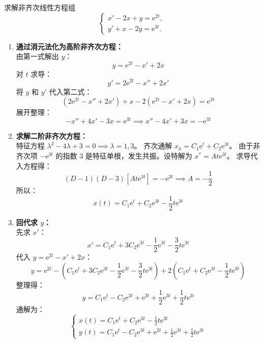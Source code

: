 \documentclass[lang=cn,11pt]{elegantbook}
\begin{document}
\begin{exercise}[提高：非齐次方程组]
求解非齐次线性方程组
\[
\begin{cases}
x'-2x+y=\mathrm{e}^{2t},\\
y'+x-2y=\mathrm{e}^{3t}.
\end{cases}
\]
\end{exercise}
\begin{solution}
\begin{enumerate}
    \item \textbf{通过消元法化为高阶非齐次方程：}\\
    由第一式解出 $y$：
    \[
    y = \mathrm{e}^{2t} - x' + 2x
    \]
    对 $t$ 求导：
    \[
    y' = 2\mathrm{e}^{2t} - x'' + 2x'
    \]
    将 $y$ 和 $y'$ 代入第二式：
    \[
    (2\mathrm{e}^{2t} - x'' + 2x') + x - 2(\mathrm{e}^{2t} - x' + 2x) = \mathrm{e}^{3t}
    \]
    展开整理：
    \[
    -x'' + 4x' - 3x = \mathrm{e}^{3t} \implies x'' - 4x' + 3x = -\mathrm{e}^{3t}
    \]
    
    \item \textbf{求解二阶非齐次方程：}\\
    特征方程 $\lambda^2 - 4\lambda + 3 = 0 \implies \lambda = 1, 3$。
    齐次通解 $x_h = C_1\mathrm{e}^t + C_2\mathrm{e}^{3t}$。
    由于非齐次项 $-\mathrm{e}^{3t}$ 的指数 $3$ 是特征单根，发生共振。设特解为 $x^* = A t \mathrm{e}^{3t}$。
    求导代入方程得：
    \[
    (D-1)(D-3)[At\mathrm{e}^{3t}] = -\mathrm{e}^{3t} \implies A = -\frac{1}{2}
    \]
    所以：
    \[
    x(t) = C_1\mathrm{e}^t + C_2\mathrm{e}^{3t} - \frac{1}{2}t\mathrm{e}^{3t}
    \]

    \item \textbf{回代求 $y$：}\\
    先求 $x'$：
    \[
    x' = C_1\mathrm{e}^t + 3C_2\mathrm{e}^{3t} - \frac{1}{2}\mathrm{e}^{3t} - \frac{3}{2}t\mathrm{e}^{3t}
    \]
    代入 $y = \mathrm{e}^{2t} - x' + 2x$：
    \[
    y = \mathrm{e}^{2t} - \left( C_1\mathrm{e}^t + 3C_2\mathrm{e}^{3t} - \frac{1}{2}\mathrm{e}^{3t} - \frac{3}{2}t\mathrm{e}^{3t} \right) + 2\left( C_1\mathrm{e}^t + C_2\mathrm{e}^{3t} - \frac{1}{2}t\mathrm{e}^{3t} \right)
    \]
    整理得：
    \[
    y = C_1\mathrm{e}^t - C_2\mathrm{e}^{3t} + \mathrm{e}^{2t} + \frac{1}{2}\mathrm{e}^{3t} + \frac{1}{2}t\mathrm{e}^{3t}
    \]
    通解为：
    \[
    \begin{cases}
    x(t) = C_1\mathrm{e}^t + C_2\mathrm{e}^{3t} - \frac{1}{2}t\mathrm{e}^{3t} \\
    y(t) = C_1\mathrm{e}^t - C_2\mathrm{e}^{3t} + \mathrm{e}^{2t} + \frac{1}{2}\mathrm{e}^{3t} + \frac{1}{2}t\mathrm{e}^{3t}
    \end{cases}
    \]
\end{enumerate}
\end{solution}
\end{document}
